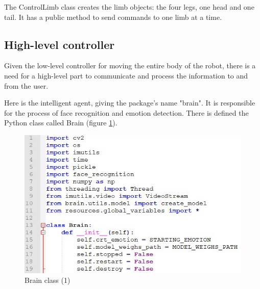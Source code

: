 \documentclass[runningheads,a4paper,12pt]{report}
\begin{document}
The ControlLimb class creates the limb objects: the four legs, one head and one tail. It has a public method to send commands to one limb at a time.   

\subsection*{High-level controller}
Given the low-level controller for moving the entire body of the robot, there is a need for a high-level part to communicate and process the information to and from the user. 

Here is the intelligent agent, giving the package's name "brain". It is responsible for the process of face recognition and emotion detection. There is defined the Python class called Brain (figure \ref{fig:3_brain1}).

\begin{figure}[h]
	\centering
	\includegraphics[width=0.7\linewidth]{./images/3_brain1}\hfill	
	\caption{Brain class (1)}  
    \label{fig:3_brain1}
\end{figure}
\end{document}
